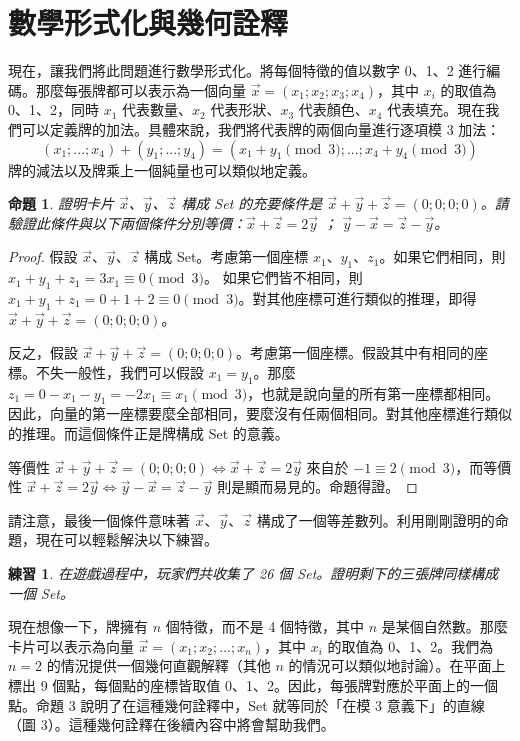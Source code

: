 \documentclass[12pt, a4paper]{article}
\newtheorem{proposition}{命題}
\newtheorem{exercise}{練習}
\begin{document}
\section*{數學形式化與幾何詮釋}

現在，讓我們將此問題進行數學形式化。將每個特徵的值以數字 0、1、2 進行編碼。那麼每張牌都可以表示為一個向量 $\vec{x}=(x_{1};x_{2};x_{3};x_{4})$，其中 $x_{i}$ 的取值為 0、1、2，同時 $x_{1}$ 代表數量、$x_{2}$ 代表形狀、$x_{3}$ 代表顏色、$x_{4}$ 代表填充。現在我們可以定義牌的加法。具體來說，我們將代表牌的兩個向量進行逐項模 3 加法：
$$(x_{1};...;x_{4})+(y_{1};...;y_{4})=(x_{1}+y_{1}\pmod{3};...;x_{4}+y_{4}\pmod{3})$$
牌的減法以及牌乘上一個純量也可以類似地定義。

\begin{proposition}
證明卡片 $\vec{x}$、$\vec{y}$、$\vec{z}$ 構成 Set 的充要條件是 $\vec{x}+\vec{y}+\vec{z}=(0;0;0;0)$。請驗證此條件與以下兩個條件分別等價：$\vec{x}+\vec{z}=2\vec{y}$ ； $\vec{y}-\vec{x}=\vec{z}-\vec{y}$。
\end{proposition}
\begin{proof}
假設 $\vec{x}$、$\vec{y}$、$\vec{z}$ 構成 Set。考慮第一個座標 $x_{1}$、$y_{1}$、$z_{1}$。如果它們相同，則 $x_{1}+ y_{1} + z_{1} = 3x_{1} \equiv 0 \pmod{3}$。
如果它們皆不相同，則 $x_{1}+ y_{1} + z_{1} = 0+1+2 \equiv 0 \pmod{3}$。對其他座標可進行類似的推理，即得 $\vec{x}+\vec{y}+\vec{z}=(0;0;0;0)$。

反之，假設 $\vec{x}+\vec{y}+\vec{z}=(0;0;0;0)$。考慮第一個座標。假設其中有相同的座標。不失一般性，我們可以假設 $x_{1}=y_{1}$。那麼 $z_{1}=0-x_{1}-y_{1}= -2x_{1} \equiv x_{1} \pmod{3}$，也就是說向量的所有第一座標都相同。因此，向量的第一座標要麼全部相同，要麼沒有任兩個相同。對其他座標進行類似的推理。而這個條件正是牌構成 Set 的意義。

等價性 $\vec{x}+\vec{y}+\vec{z}=(0;0;0;0)\Leftrightarrow\vec{x}+\vec{z}=2\vec{y}$ 來自於 $-1\equiv2 \pmod{3}$，而等價性 $\vec{x}+\vec{z}=2\vec{y}\Leftrightarrow\vec{y}-\vec{x}=\vec{z}-\vec{y}$ 則是顯而易見的。命題得證。
\end{proof}

請注意，最後一個條件意味著 $\vec{x}$、$\vec{y}$、$\vec{z}$ 構成了一個等差數列。利用剛剛證明的命題，現在可以輕鬆解決以下練習。

\begin{exercise}
在遊戲過程中，玩家們共收集了 26 個 Set。證明剩下的三張牌同樣構成一個 Set。
\end{exercise}

現在想像一下，牌擁有 $n$ 個特徵，而不是 4 個特徵，其中 $n$ 是某個自然數。那麼卡片可以表示為向量 $\vec{x}=(x_{1};x_{2};...;x_{n})$，其中 $x_{i}$ 的取值為 0、1、2。我們為 $n=2$ 的情況提供一個幾何直觀解釋（其他 $n$ 的情況可以類似地討論）。在平面上標出 9 個點，每個點的座標皆取值 0、1、2。因此，每張牌對應於平面上的一個點。命題 3 說明了在這種幾何詮釋中，Set 就等同於「在模 3 意義下」的直線（圖 3）。這種幾何詮釋在後續內容中將會幫助我們。
\end{document}
